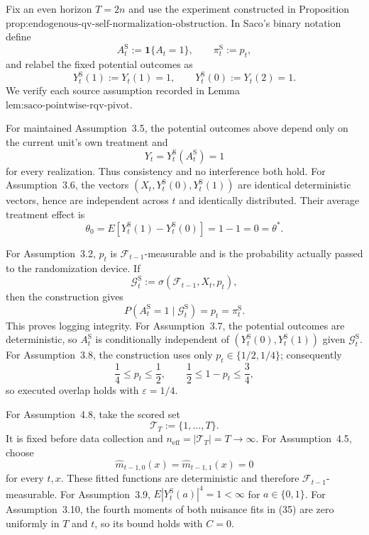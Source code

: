 Fix an even horizon \(T=2n\) and use the experiment constructed in Proposition~\(\text{prop:endogenous-qv-self-normalization-obstruction}\).  In Saco's binary notation define
\[
 A_t^{\mathrm S}:=\mathbf 1\{A_t=1\},\qquad
 \pi_t^{\mathrm S}:=p_t,
\]
and relabel the fixed potential outcomes as
\[
 Y_t^{\mathrm S}(1):=Y_t(1)=1,
 \qquad
 Y_t^{\mathrm S}(0):=Y_t(2)=1.
\]
We verify each source assumption recorded in Lemma~\(\text{lem:saco-pointwise-rqv-pivot}\).

For maintained Assumption~3.5, the potential outcomes above depend only on the current unit's own treatment and
\[
 Y_t=Y_t^{\mathrm S}(A_t^{\mathrm S})=1
\]
for every realization.  Thus consistency and no interference both hold.  For Assumption~3.6, the vectors \((X_t,Y_t^{\mathrm S}(0),Y_t^{\mathrm S}(1))\) are identical deterministic vectors, hence are independent across \(t\) and identically distributed.  Their average treatment effect is
\[
 \theta_0=E\!\left[Y_t^{\mathrm S}(1)-Y_t^{\mathrm S}(0)\right]
 =1-1=0=\theta^*.
\tag{32}
\]

For Assumption~3.2, \(p_t\) is \(\mathcal F_{t-1}\)-measurable and is the probability actually passed to the randomization device.  If
\[
 \mathcal G_t^{\mathrm S}:=\sigma(\mathcal F_{t-1},X_t,p_t),
\]
then the construction gives
\[
 P(A_t^{\mathrm S}=1\mid\mathcal G_t^{\mathrm S})
 =p_t=\pi_t^{\mathrm S}.
\tag{33}
\]
This proves logging integrity.  For Assumption~3.7, the potential outcomes are deterministic, so \(A_t^{\mathrm S}\) is conditionally independent of \((Y_t^{\mathrm S}(0),Y_t^{\mathrm S}(1))\) given \(\mathcal G_t^{\mathrm S}\).  For Assumption~3.8, the construction uses only \(p_t\in\{1/2,1/4\}\); consequently
\[
 \frac14\le p_t\le\frac12,
 \qquad
 \frac12\le1-p_t\le\frac34,
\tag{34}
\]
so executed overlap holds with \(\varepsilon=1/4\).

For Assumption~4.8, take the scored set
\[
 \mathcal T_T:=\{1,\ldots,T\}.
\]
It is fixed before data collection and \(n_{\mathrm{eff}}=|\mathcal T_T|=T\to\infty\).  For Assumption~4.5, choose
\[
 \widehat m_{t-1,0}(x)=\widehat m_{t-1,1}(x)=0
\tag{35}
\]
for every \(t,x\).  These fitted functions are deterministic and therefore \(\mathcal F_{t-1}\)-measurable.  For Assumption~3.9, \(E|Y_t^{\mathrm S}(a)|^4=1<\infty\) for \(a\in\{0,1\}\).  For Assumption~3.10, the fourth moments of both nuisance fits in (35) are zero uniformly in \(T\) and \(t\), so its bound holds with \(C=0\).

